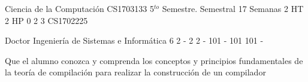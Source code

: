 \documentclass[a4paper,8pt]{article}
\begin{document}
\setNombreProfesor{}
\setGradoProfesorAbreviado{}
\sylabusHeader

\academicaTable
{Ciencia de la Computación} %
{CS1703133} %
{5$^{to}$ Semestre.} %
{Semestral} %
{17 Semanas} %
{2 HT} %
{2 HP} %
{0} %
{}  %
{2} %
{3} %
{CS1702225} %

\administrativaTable
{Doctor} %
{Ingeniería de Sistemas e Informática} %
{6} %
{2} %
{-} %
{2} %
{2} %
{-} %
{101} %
{-} %
{101} %
{101} %
{-} %


\begin{fundamentacion}
Que el alumno conozca y comprenda los conceptos y principios fundamentales de la teoría de compilación para realizar la construcción de un compilador

\end{fundamentacion}

\begin{sumilla}
\item \PLProgramRepresentation
\item \PLLanguageTranslationandExecution
\item \PLSyntaxAnalysis
\item \PLCompilerSemanticAnalysis
\item \PLCodeGeneration

\end{sumilla}

\begin{competenciasAsignatura}
\item {}
\item {}

\end{competenciasAsignatura}
\end{document}
